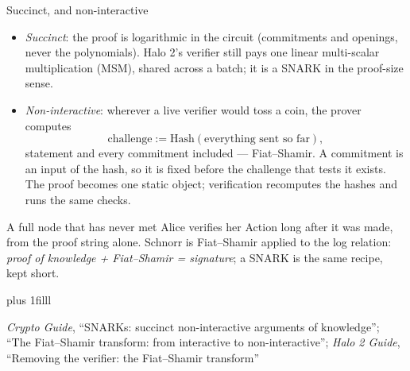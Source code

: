 \documentclass[aspectratio=169,11pt]{beamer}
\newcommand{\src}[1]{\par\vskip0pt plus 1filll
  {\fontsize{6}{7.2}\selectfont\color{arbdim}\raggedright #1\par}}
\begin{document}
\begin{frame}{Succinct, and non-interactive}
\begin{itemize}
  \item \emph{Succinct}: the proof is logarithmic in the circuit
    (commitments and openings, never the polynomials). Halo 2's verifier
    still pays one linear multi-scalar multiplication (MSM), shared across a
    batch; it is a SNARK in the proof-size sense.
  \item \emph{Non-interactive}: wherever a live verifier would toss a
    coin, the prover computes
    \[
    \text{challenge} := \mathrm{Hash}(\text{everything sent so far}),
    \]
    statement and every commitment included --- Fiat--Shamir. A
    commitment is an input of the hash, so it is fixed before the
    challenge that tests it exists. The proof becomes one static object;
    verification recomputes the hashes and runs the same checks.
\end{itemize}
A full node that has never met Alice verifies her Action long after it
was made, from the proof string alone. Schnorr is Fiat--Shamir applied
to the log relation: \emph{proof of knowledge + Fiat--Shamir =
signature}; a SNARK is the same recipe, kept short.
\src{\emph{Crypto Guide}, ``SNARKs: succinct non-interactive arguments of
knowledge''; ``The Fiat--Shamir transform: from interactive to
non-interactive''; \emph{Halo 2 Guide}, ``Removing the verifier: the
Fiat--Shamir transform''}
\end{frame}
\end{document}
